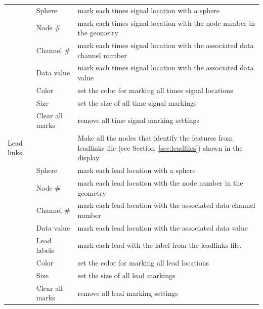 \begin{table}[ht]
\begin{center}
\begin{tabular}{|l|l|p{4 in}|}
    &  Sphere & mark each times signal location with a sphere \\
    &  Node \# & mark each times signal location with the node number in
    the geometry \\ 
    &  Channel \# & mark each times signal location with the associated
    data channel number \\ 
    &  Data value & mark each times signal location with the associated
    data value \\ 
    &  Color & set the color for marking all times signal locations \\
    &  Size & set the size of all time signal markings \\
   &  Clear all marks & remove all time signal marking settings \\ 
    \hline
    Lead links & & Make all the nodes that identify the features from
    leadlinks file 
       (see Section~\ref{sec:leadfiles}) shown in the display  \\
    &  Sphere & mark each lead location with a sphere \\
    &  Node \# & mark each lead location with the node number in
    the geometry \\ 
    &  Channel \# & mark each lead location with the associated
    data channel number \\ 
    &  Data value & mark each lead location with the associated
    data value \\ 
    &  Lead labels & mark each lead with the label from the leadlinks file.\\
    &  Color & set the color for marking all lead locations \\
    &  Size & set the size of all lead markings \\
   &  Clear all marks & remove all lead marking settings \\ 
    \hline
    \end{tabular}
  \end{center}
\end{table}

